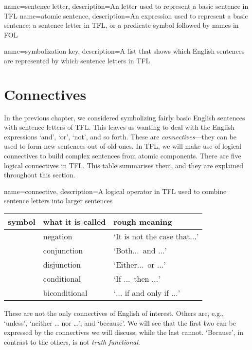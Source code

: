 {
name=sentence letter,
description={An letter used to represent a basic sentence in TFL}
}
{
name=atomic sentence,
description={An expression used to represent a basic sentence; a sentence letter in TFL, or a predicate symbol followed by names in FOL}
}

{
name=symbolization key,
description={A list that shows which English sentences are represented by which \glspl{sentence letter} in TFL}
}

\chapter{Connectives}
\label{s:TFLConnectives}

In the previous chapter, we considered symbolizing fairly basic English sentences with sentence letters of TFL. This leaves us wanting to deal with the English expressions `and', `or', `not', and so forth. These are \emph{connectives}---they can be used to form new sentences out of old ones. In TFL, we will make use of logical connectives to build complex sentences from atomic components. There are five logical connectives in TFL. This table summarises them, and they are explained throughout this section.

{
name=connective,
description={A logical operator in TFL used to combine \glspl{sentence letter} into larger sentences}
}
	\begin{table}[h]
	\center
	\begin{tabular}{l l l}
	
	\textbf{symbol}&\textbf{what it is called}&\textbf{rough meaning}\\
	\hline
	\enot&negation&`It is not the case that$\ldots$'\\
	\eand&conjunction&`Both$\ldots$\ and $\ldots$'\\
	\eor&disjunction&`Either$\ldots$\ or $\ldots$'\\
	\eif&conditional&`If $\ldots$\ then $\ldots$'\\
	\eiff&biconditional&`$\ldots$ if and only if $\ldots$'\\
	
	\end{tabular}
	\end{table}

These are not the only connectives of English of interest. Others are, e.g., `unless', `neither \dots{} nor \dots', and `because'. We will see that the first two can be expressed by the connectives we will discuss, while the last cannot. `Because', in contrast to the others, is not \emph{truth functional}.

